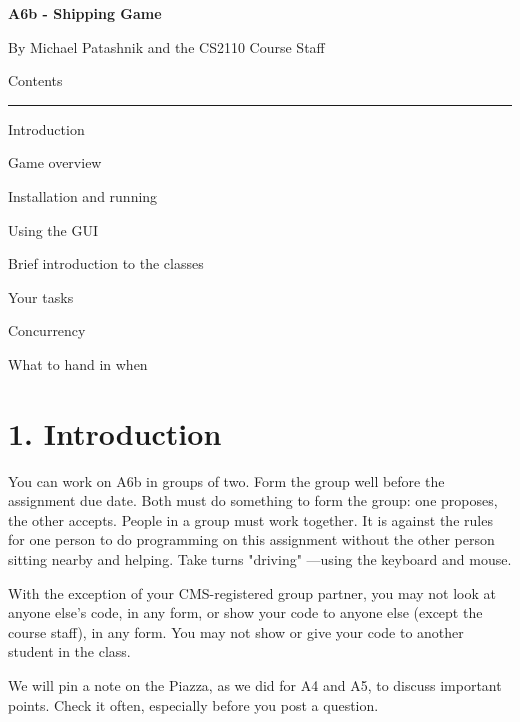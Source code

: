 \documentclass[11pt]{article}
\begin{document}
\lstset{language=Java}
\begin{center}
\begin{HUGE}{\bf A6b - Shipping Game}\\ \end{HUGE}
\vspace{3mm}
\begin{LARGE} By Michael Patashnik and the CS2110 Course Staff\\ \end{LARGE}
\vspace{7mm}
\begin{LARGE} Contents\\ \end{LARGE}
\noindent\rule{8cm}{0.4pt}
\begin{enumerate} \begin{large}
\item Introduction\item Game overview
\item Installation and running
\item Using the GUI
\item Brief introduction to the classes
\item Your tasks
\item Concurrency
\item What to hand in when
\end{large}\end{enumerate}
\end{center}

\section{1. Introduction}
You can work on A6b in groups of two. Form the group well before the assignment due date. Both must do something to form the group:
one proposes, the other accepts.
People in a group must work together. It is against the rules for one person to do programming on this assignment
without the other person sitting nearby and helping. Take turns "driving" ---using the keyboard and mouse.

With the exception of your CMS-registered group partner, you may not look at anyone else's code, in any form,
or show your code to anyone else (except the course staff), in any form. You may not show or give your code to another
student in the class.

We will pin a note on the Piazza, as we did for A4 and A5, to discuss important points. Check it often, especially before you post a question.
\end{document}
